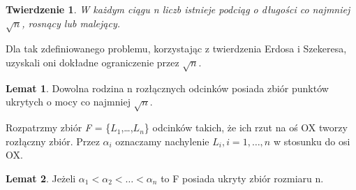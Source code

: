 \documentclass[brudnopis]{xmgr}
\newtheorem{Twierdzenie}{Twierdzenie} \theoremstyle{definition}
\newtheorem{Lemat}{Lemat} \theoremstyle{definition}
\begin{document}
\begin{Twierdzenie}\label{podciag rosnacy}
  W każdym ciągu n liczb istnieje podciąg o długości co najmniej $\sqrt{n}$, rosnący lub malejący.
\end{Twierdzenie}

Dla tak zdefiniowanego problemu, korzystając z twierdzenia Erdosa i Szekeresa, uzyskali oni dokładne ograniczenie przez $\sqrt{n}$.
\begin{Lemat}\label{moc zbioru ukrytego tw}
  Dowolna rodzina n rozłącznych odcinków posiada zbiór punktów ukrytych o mocy co najmniej $\sqrt{n}$.
\end{Lemat}

Rozpatrzmy zbiór \textit{F} = \{$L_1$,\ldots,$L_n$\} odcinków takich, że ich rzut na oś OX tworzy rozłączny zbiór. Przez $\alpha_i$ oznaczamy nachylenie $L_i, i = 1,\ldots,n$ w stosunku do osi OX.
\begin{Lemat}\label{zbior ukryty}
  Jeżeli $\alpha_1 < \alpha_2 < \ldots < \alpha_n$ to F posiada ukryty zbiór rozmiaru n.
\end{Lemat}
\end{document}

